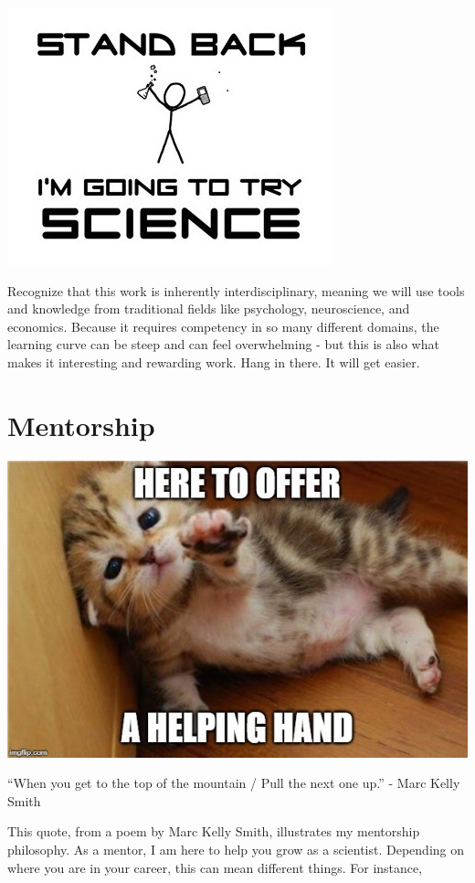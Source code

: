 \documentclass[]{book}
\begin{document}
\includegraphics{images/xkcd_science.png}

Recognize that this work is inherently interdisciplinary, meaning we will use tools and knowledge from traditional fields like psychology, neuroscience, and economics. Because it requires competency in so many different domains, the learning curve can be steep and can feel overwhelming - but this is also what makes it interesting and rewarding work. Hang in there. It will get easier.

\hypertarget{mentorship}{%
\section{Mentorship}\label{mentorship}}

\includegraphics{images/help.jpeg}

``When you get to the top of the mountain / Pull the next one up.'' - Marc Kelly Smith

This quote, from a poem by Marc Kelly Smith, illustrates my mentorship philosophy. As a mentor, I am here to help you grow as a scientist. Depending on where you are in your career, this can mean different things. For instance,
\end{document}
